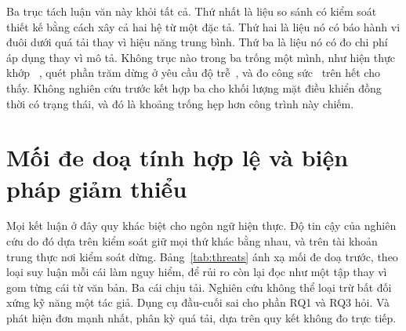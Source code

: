 Ba trục tách luận văn này khỏi tất cả. Thứ nhất là liệu so sánh có kiểm soát
thiết kế bằng cách xây cả hai hệ từ một đặc tả. Thứ hai là liệu nó có báo hành vi
đuôi dưới quá tải thay vì hiệu năng trung bình. Thứ ba là liệu nó có đo
chi phí áp dụng thay vì mô tả. Không trục nào trong ba trống một mình, như hiện thực khớp
~\cite{emmerich2019drivers,li2021ipc,narayanan2020redleaf,suchert2023stamp,gonzalez2023rustudp,pirelli2023safelowlevel,emberg2023asn1},
quét phần trăm dừng ở yêu cầu độ trễ~\cite{arvidsson2025async}, và đo
công sức~\cite{karlback2021ran,fulton2021adopting} trên hết cho thấy. Không nghiên cứu trước kết hợp
ba cho khối lượng mặt điều khiển đồng thời có trạng thái, và đó là khoảng trống hẹp hơn công trình này
chiếm.

\section{Mối đe doạ tính hợp lệ và biện pháp giảm thiểu}\label{sec:threats}
Mọi kết luận ở đây quy khác biệt cho ngôn ngữ hiện thực. Độ tin cậy của nghiên cứu do đó dựa trên kiểm soát giữ mọi thứ khác bằng nhau, và trên
tài khoản trung thực nơi kiểm soát dừng. Bảng~\ref{tab:threats} ánh xạ mối đe doạ trước, theo
loại suy luận mỗi cái làm nguy hiểm, để rủi ro còn lại đọc như một tập thay vì
gom từng cái từ văn bản. Ba cái chịu tải. Nghiên cứu không thể loại trừ
bất đối xứng kỹ năng một tác giả. Dụng cụ đầu-cuối sai cho phần RQ1
và RQ3 hỏi. Và phát hiện đơn mạnh nhất, phân kỳ quá tải, dựa trên quy kết
không đo trực tiếp.

